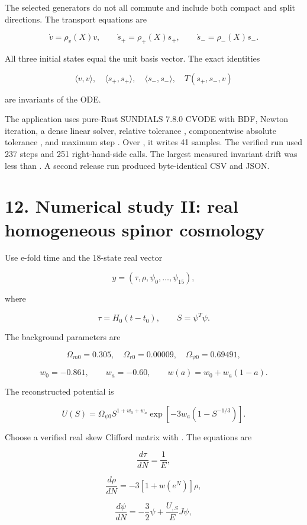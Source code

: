 \documentclass[11pt]{article}
\begin{document}
The selected generators do not all commute and include both compact and split directions. The transport equations are

\[
\dot v=\rho_v(X)v,
\qquad
\dot s_+=\rho_+(X)s_+,
\qquad
\dot s_-=\rho_-(X)s_-.
\]

All three initial states equal the unit basis vector. The exact identities

\[
\langle v,v\rangle,
\quad
\langle s_+,s_+\rangle,
\quad
\langle s_-,s_-\rangle,
\quad
T(s_+,s_-,v)
\]

are invariants of the ODE.

The application uses pure-Rust SUNDIALS 7.8.0 CVODE with BDF, Newton iteration, a dense linear solver, relative tolerance \texttt{}, componentwise absolute tolerance \texttt{}, and maximum step \texttt{}. Over \texttt{}, it writes 41 samples. The verified run used 237 steps and 251 right-hand-side calls. The largest measured invariant drift was less than \texttt{}. A second release run produced byte-identical CSV and JSON.

\section{12. Numerical study II: real homogeneous spinor cosmology}

Use e-fold time \texttt{} and the 18-state real vector

\[
y=(\tau,\rho,\psi_0,\ldots,\psi_{15}),
\]

where

\[
\tau=H_0(t-t_0),
\qquad
S=\psi^T\psi.
\]

The background parameters are

\[
\Omega_{m0}=0.305,
\quad
\Omega_{r0}=0.00009,
\quad
\Omega_{\psi0}=0.69491,
\]

\[
w_0=-0.861,
\qquad
w_a=-0.60,
\qquad
w(a)=w_0+w_a(1-a).
\]

The reconstructed potential is

\[
U(S)=\Omega_{\psi0}
S^{1+w_0+w_a}
\exp\left[-3w_a\left(1-S^{-1/3}\right)\right].
\]

Choose a verified real skew Clifford matrix \texttt{} with \texttt{}. The equations are

\[
\frac{d\tau}{dN}=\frac1E,
\]

\[
\frac{d\rho}{dN}=-3[1+w(e^N)]\rho,
\]

\[
\frac{d\psi}{dN}=-\frac32\psi+\frac{U_{,S}}EJ\psi,
\]
\end{document}
